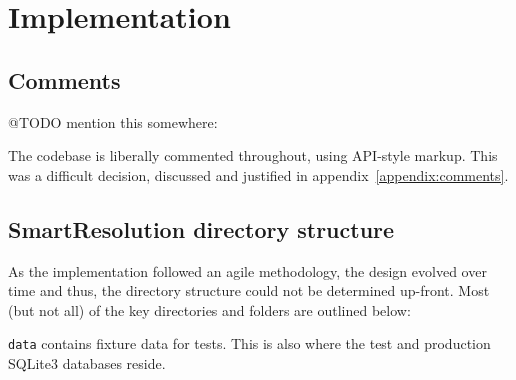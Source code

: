 \chapter{Implementation} %

\section{Comments}

@TODO mention this somewhere:

The codebase is liberally commented throughout, using API-style markup. This was a difficult decision, discussed and justified in appendix~\ref{appendix:comments}.

\section{SmartResolution directory structure}

As the implementation followed an agile methodology, the design evolved over time and thus, the directory structure could not be determined up-front. Most (but not all) of the key directories and folders are outlined below:

\begin{samepage}
\end{samepage}

\lstinline{data} contains fixture data for tests. This is also where the test and production SQLite3 databases reside.

